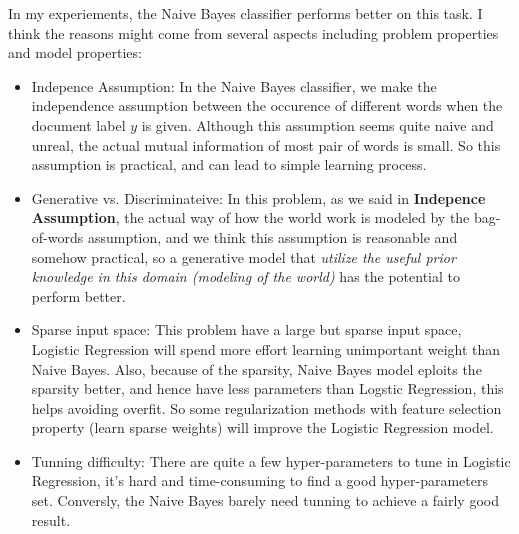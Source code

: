 \documentclass{article}
\theoremstyle{definition}
\theoremstyle{definition}
\theoremstyle{remark}
\begin{document}
\begin{addmargin}[3em]{2em}
  In my experiements, the Naive Bayes classifier performs better on this task. I think the reasons might come from several aspects including problem properties and model properties:
  \begin{itemize}
  \item Indepence Assumption: In the Naive Bayes classifier, we make the independence assumption between the occurence of different words when the document label $y$ is given. Although this assumption seems quite naive and unreal, the actual mutual information of most pair of words is small. So this assumption is practical, and can lead to simple learning process.
  \item Generative vs. Discriminateive: In this problem, as we said in \textbf{Indepence Assumption}, the actual way of how the world work is modeled by the bag-of-words assumption, and we think this assumption is reasonable and somehow practical, so a generative model that \textit{utilize the useful prior knowledge in this domain (modeling of the world)} has the potential to perform better.
  \item Sparse input space: This problem have a large but sparse input space, Logistic Regression will spend more effort learning unimportant weight than Naive Bayes. Also, because of the sparsity, Naive Bayes model eploits the sparsity better, and hence have less parameters than Logstic Regression, this helps avoiding overfit. So some regularization methods with feature selection property (learn sparse weights) will improve the Logistic Regression model.
  \item Tunning difficulty: There are quite a few hyper-parameters to tune in Logistic Regression, it's hard and time-consuming to find a good hyper-parameters set. Conversly, the Naive Bayes barely need tunning to achieve a fairly good result.
  \end{itemize}
\end{addmargin}




\end{document}
